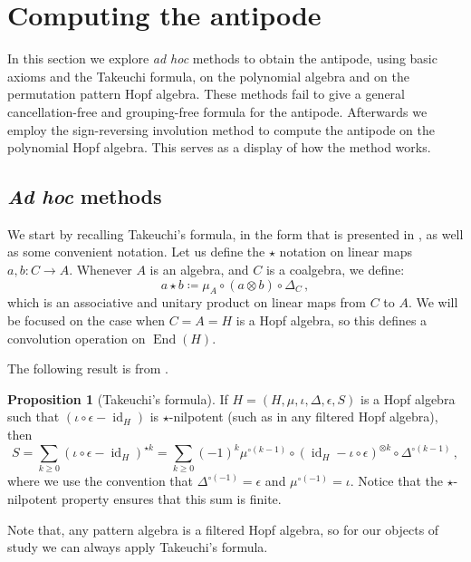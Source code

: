 \documentclass[12pt, reqno]{amsart}
\theoremstyle{definition}
\newtheorem{prop}[thm]{Proposition}
\DeclareMathOperator{\id}{id}
\DeclareMathOperator{\End}{\mathrm{End}}
\begin{document}
\section{Computing the antipode\label{sec:antipode_computing}}

In this section we explore \textit{ad hoc} methods to obtain the antipode, using basic axioms and the Takeuchi formula, on the polynomial algebra and on the permutation pattern Hopf algebra.
These methods fail to give a general cancellation-free and grouping-free formula for the antipode.
Afterwards we employ the sign-reversing involution method to compute the antipode on the polynomial Hopf algebra.
This serves as a display of how the method works.

\subsection{\textit{Ad hoc} methods}
We start by recalling Takeuchi's formula, in the form that is presented in \cite{GrinbergReiner}, as well as some convenient notation.
Let us define the $\star$ notation on linear maps $a, b: C \to A$.
Whenever $A$ is an algebra, and $C$ is a coalgebra, we define:
$$a \star b \coloneqq \mu_A \circ (a \otimes b) \circ \Delta_C\, ,$$
which is an associative and unitary product on linear maps from $C$ to $A$. We will be focused on the case when $C=A=H$ is a Hopf algebra, so this defines a convolution operation on $\End(H)$.

The following result is from \cite[Lemma 14]{Takeuchi1971}.

\begin{prop}[Takeuchi's formula]\label{lm:takeuchi}
If $H = (H, \mu, \iota, \Delta, \epsilon, S)$ is a Hopf algebra such that $(\iota\circ \epsilon - \id_H)$ is $\star$-nilpotent (such as in any filtered Hopf algebra), then 
\begin{equation}\label{eq:eq1}
S = \sum_{k\geq 0 }  ( \iota  \circ\epsilon- \id_H)^{\star k} = \sum_{k\geq 0} (-1)^k \mu^{\circ (k-1)} \circ (\id_{H} - \iota \circ \epsilon)^{\otimes k} \circ \Delta^{\circ (k-1)}\, ,
\end{equation}
where we use the convention that $\Delta^{\circ (-1)} = \epsilon $ and $\mu^{\circ (-1)} = \iota$.
Notice that the $\star$-nilpotent property ensures that this sum is finite.
\end{prop}

Note that, any pattern algebra is a filtered Hopf algebra, so for our objects of study we can always apply Takeuchi's formula.
\end{document}
